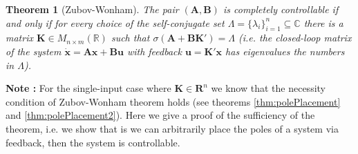 \documentclass[a4paper,10pt,oneside]{book}
\newtheorem{theorem}{Theorem}
\begin{document}
\begin{theorem}[Zubov-Wonham]
 The pair $(\mathbf{A},\mathbf{B})$ is completely controllable if and only if for every choice of the self-conjugate set
$\Lambda=\{\lambda_i\}_{i=1}^n \subseteq \mathbb{C}$ there is a matrix $\mathbf{K}\in M_{n\times m}(\mathbb{R})$ 
such that $\sigma(\mathbf{A} + \mathbf{BK}')=\Lambda$ (i.e. the closed-loop matrix of the system $\dot{\mathbf{x}}=\mathbf{Ax}+\mathbf{Bu}$ with feedback $\mathbf{u}=
\mathbf{K}'\mathbf{x}$ has eigenvalues the numbers in $\Lambda$).
\end{theorem}
\noindent \textbf{Note :} For the single-input case where $\mathbf{K}\in\mathbf{R}^n$ we know that 
the necessity condition of Zubov-Wonham theorem holds (see theorems \ref{thm:polePlacement} and \ref{thm:polePlacement2}). Here we
give a proof of the sufficiency of the theorem, i.e. we show that is we can arbitrarily place the poles
of a system via feedback, then the system is controllable.
\end{document}
